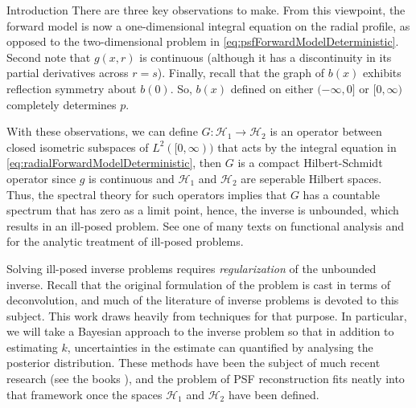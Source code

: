 \begin{chapter}{Introduction}
  There are three key observations to make.
  From this viewpoint, the forward model is now a one-dimensional integral equation on the radial profile, as opposed to the two-dimensional problem in \eqref{eq:psfForwardModelDeterministic}.
  Second note that $g(x,r)$ is continuous (although it has a discontinuity in its partial derivatives across $r=s$).
  Finally, recall that the graph of $b(x)$ exhibits reflection symmetry about $b(0)$.
  So, $b(x)$ defined on either $(-\infty,0]$ or $[0,\infty)$ completely determines $p$.

  With these observations, we can define $G: \mathcal H_1 \to \mathcal H_2$ is an operator between closed isometric subspaces of $L^2([0,\infty))$ that acts by the integral equation in \eqref{eq:radialForwardModelDeterministic}, then $G$ is a compact Hilbert-Schmidt operator since $g$ is continuous and $\mathcal H_1$ and $\mathcal H_2$ are seperable Hilbert spaces.
  Thus, the spectral theory for such operators implies that $G$ has a countable spectrum that has zero as a limit point, hence, the inverse is unbounded, which results in an ill-posed problem. 
  See one of many texts on functional analysis \citep{bachman1966,rudin1991} and \citep{tikhonov1963,vogel2002,morozov1993} for the analytic treatment of ill-posed problems.

  Solving ill-posed inverse problems requires \emph{regularization} of the unbounded inverse.
  Recall that the original formulation of the problem is cast in terms of deconvolution, and much of the literature of inverse problems is devoted to this subject.
  This work draws heavily from techniques for that purpose. 
  In particular, we will take a Bayesian approach to the inverse problem so that in addition to estimating $k$, uncertainties in the estimate can quantified by analysing the posterior distribution.
  These methods have been the subject of much recent research (see the books \citep{calvetti2007introduction,kaipo2005,stuart2010}), and the problem of PSF reconstruction fits neatly into that framework once the spaces $\mathcal H_1$ and $\mathcal H_2$ have been defined.

\begin{figure}
  \begin{center}
\end{center}
\end{figure}
\end{chapter}

